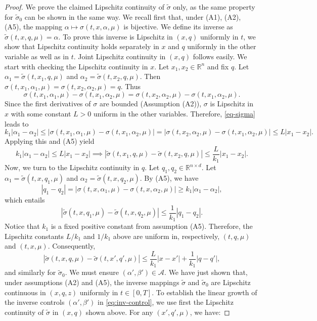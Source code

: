 \documentclass[11pt,a4paper]{article}
\begin{document}
\begin{proof}
We prove the claimed Lipschitz continuity of $\tilde \sigma$ only, as the same property for $\tilde \sigma_0$ can be shown in the same way. We recall first that, under (A1), (A2), (A5), the mapping $\alpha \mapsto \sigma(t, x, \alpha, \mu)$ is bijective. We define its inverse as $\tilde{\sigma}(t, x, q, \mu) = \alpha$. To prove this inverse is Lipschitz in $(x, q)$ uniformly in $t$, we show that Lipschitz continuity holds separately in $x$ and $q$ uniformly in the other variable as well as in $t$. Joint Lipschitz continuity in $(x,q)$ follows easily. 
We start with checking the Lipschitz continuity in $x$. 
Let $x_1, x_2 \in \mathbb{R}^n$ and fix $q$. Let $\alpha_1 = \tilde{\sigma}(t, x_1, q, \mu)$ and $\alpha_2 = \tilde{\sigma}(t , x_2, q, \mu)$. Then $\sigma(t, x_1, \alpha_1, \mu) = \sigma(t, x_2, \alpha_2, \mu) = q$. Thus
    \begin{equation}\label{eq-sigma} \sigma(t, x_1, \alpha_1, \mu) - \sigma(t, x_1, \alpha_2, \mu) = \sigma(t, x_2, \alpha_2, \mu) - \sigma(t, x_1, \alpha_2, \mu). \end{equation}
Since the first derivatives of $\sigma$ are bounded  (Assumption (A2)), $\sigma$ is Lipschitz in $x$ with some constant $L>0$ uniform in the other variables. Therefore, \eqref{eq-sigma} leads to
     \[ k_1 |\alpha_1 - \alpha_2| \leq |\sigma(t, x_1, \alpha_1, \mu) - \sigma(t, x_1, \alpha_2, \mu)| = |\sigma(t, x_2, \alpha_2, \mu) - \sigma(t, x_1, \alpha_2, \mu)| \leq  L |x_1 - x_2|  . \]
 Applying this and (A5) yield
    \[ k_1 |\alpha_1 - \alpha_2| \leq L |x_1 - x_2| \implies |\tilde{\sigma}(t, x_1, q, \mu) - \tilde{\sigma}(t, x_2, q, \mu)| \leq \frac{L}{k_1} |x_1 - x_2|. \]
Now, we turn to the Lipschitz continuity in $q$. Let $q_1, q_2 \in \mathbb{R}^{n \times d}$. Let $\alpha_1 = \tilde{\sigma}(t, x, q_1, \mu)$ and $\alpha_2 = \tilde{\sigma}(t, x, q_2, \mu)$. By (A5), we have
    \[ |q_1 - q_2| = |\sigma(t, x, \alpha_1, \mu) - \sigma(t, x, \alpha_2, \mu)| \geq k_1 |\alpha_1 - \alpha_2|, \]
    which entails
    \[|\tilde{\sigma}(t, x, q_1, \mu) - \tilde{\sigma}(t, x, q_2, \mu)| \leq \frac{1}{k_1} |q_1 - q_2|. \]   
    Notice that $k_1$ is a fixed positive constant from assumption (A5). Therefore, the Lipschitz constants $L/k_1$ and $1/k_1$ above are uniform in, respectively, $(t,q,\mu)$ and $(t,x,\mu)$. Consequently, 
\[ |\tilde{\sigma}(t, x, q, \mu) - \tilde{\sigma}(t, x', q', \mu)| \leq \frac{L}{k_1} |x - x'| + \frac{1}{k_1} |q - q'|, \]
and similarly for $\tilde \sigma_0$.
We must ensure $(\alpha', \beta') \in \mathcal{A}$. We have just shown that, under assumptions (A2) and (A5), the inverse mappings $\tilde{\sigma}$ and $\tilde{\sigma}_0$ are Lipschitz continuous in $(x, q, z)$ uniformly in $t \in [0,T]$. To establish the linear growth of the inverse controls $(\alpha',\beta')$ in \eqref{eq:inv-control}, we use first the Lipschitz continuity of $\tilde{\sigma }$ in \((x, q)\) shown above. For any \((x', q', \mu)\), we have:

\end{proof}
\end{document}
